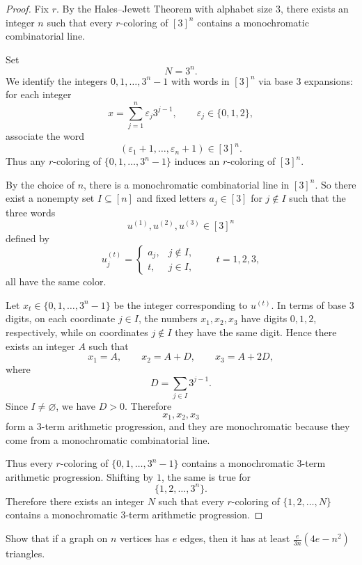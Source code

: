 \documentclass[11pt, a4paper]{ctexrep}
\begin{document}
\begin{proof}
    Fix \(r\). By the Hales--Jewett Theorem with alphabet size \(3\), there exists
    an integer $n$ such that every \(r\)-coloring of \([3]^n\) contains a monochromatic
    combinatorial line.

    Set
    \[
        N=3^n.
    \]
    We identify the integers \(0,1,\dots,3^n-1\) with words in \([3]^n\) via base \(3\)
    expansions: for each integer
    \[
        x=\sum_{j=1}^n \varepsilon_j 3^{j-1}, \qquad \varepsilon_j\in\{0,1,2\},
    \]
    associate the word
    \[
        (\varepsilon_1+1,\dots,\varepsilon_n+1)\in [3]^n.
    \]
    Thus any \(r\)-coloring of \(\{0,1,\dots,3^n-1\}\) induces an \(r\)-coloring of \([3]^n\).

    By the choice of \(n\), there is a monochromatic combinatorial line in \([3]^n\).
    So there exist a nonempty set \(I\subseteq [n]\) and fixed letters \(a_j\in[3]\) for
    \(j\notin I\) such that the three words
    \[
        u^{(1)},u^{(2)},u^{(3)}\in[3]^n
    \]
    defined by
    \[
        u^{(t)}_j=
        \begin{cases}
            a_j, & j\notin I, \\
            t,   & j\in I,
        \end{cases}
        \qquad t=1,2,3,
    \]
    all have the same color.

    Let \(x_t\in\{0,1,\dots,3^n-1\}\) be the integer corresponding to \(u^{(t)}\).
    In terms of base \(3\) digits, on each coordinate \(j\in I\), the numbers
    \(x_1,x_2,x_3\) have digits \(0,1,2\), respectively, while on coordinates
    \(j\notin I\) they have the same digit. Hence there exists an integer \(A\) such that
    \[
        x_1=A,\qquad x_2=A+D,\qquad x_3=A+2D,
    \]
    where
    \[
        D=\sum_{j\in I} 3^{j-1}.
    \]
    Since \(I\neq\varnothing\), we have \(D>0\). Therefore
    \[
        x_1,x_2,x_3
    \]
    form a \(3\)-term arithmetic progression, and they are monochromatic because
    they come from a monochromatic combinatorial line.

    Thus every \(r\)-coloring of \(\{0,1,\dots,3^n-1\}\) contains a monochromatic
    \(3\)-term arithmetic progression. Shifting by \(1\), the same is true for
    \[
        \{1,2,\dots,3^n\}.
    \]
    Therefore there exists an integer \(N\) such that every \(r\)-coloring of
    \(\{1,2,\dots,N\}\) contains a monochromatic \(3\)-term arithmetic progression.
\end{proof}

\begin{exercise}
    Show that if a graph on $n$ vertices has $e$ edges, then it has at least $\frac{e}{3n}(4e - n^2)$ triangles.
\end{exercise}
\end{document}
